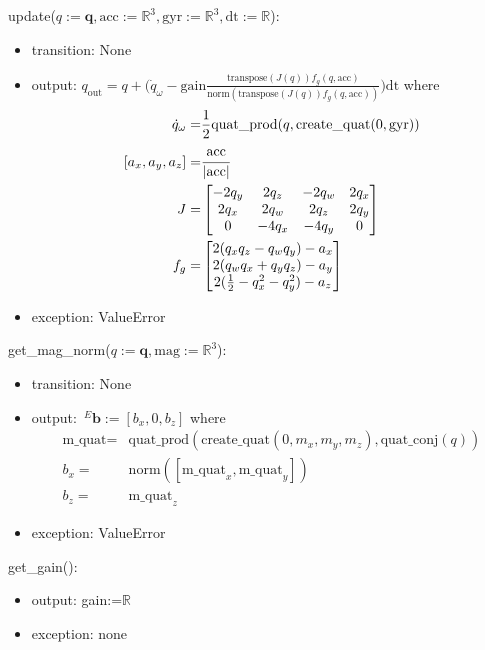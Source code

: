\documentclass[12pt, titlepage]{article}
\begin{document}
\noindent update($q:=\mathbf{q}, \text{acc}:=\mathbb{R}^3, \text{gyr}:=\mathbb{R}^3,
\text{dt}:=\mathbb{R}$):
\begin{itemize}
\item transition: None
\item output: $q_\text{out} = q + \Big( \dot{q}_{\omega} -
\text{gain}\frac{\text{transpose}(J(q))f_g( q, \text{acc})}{\text{norm}(\text{transpose}(J(q))f_g(
q, \text{acc}))}\Big) \text{dt}$ where
\begin{align*}
  \dot{q}_{\omega} =& \frac{1}{2} \text{quat\_prod}(q, \text{create\_quat}(0, \text{gyr})) \\
  [a_x, a_y, a_z] =& \cfrac{\text{acc}}{|\text{acc}|} \\
  J =& \begin{bmatrix}
    -2q_y & 2q_z & -2q_w & 2q_x \\
    2q_x & 2q_w & 2q_z & 2q_y \\
    0 & -4q_x & -4q_y & 0
    \end{bmatrix}\\
  f_{g} =& \begin{bmatrix}
    2(q_xq_z-q_wq_y)-a_x \\ 2(q_wq_x+q_yq_z)-a_y \\ 2(\frac{1}{2}-q_x^2-q_y^2)-a_z
  \end{bmatrix}
\end{align*}
\item exception: ValueError
\end{itemize}

\noindent get\_mag\_norm($q:=\mathbf{q}, \text{mag}:=\mathbb{R}^3$):
\begin{itemize}
\item transition: None
\item output: $\,^E\mathbf{b}:= [b_x, 0, b_z]$ where
\begin{align*}
  \text{m\_quat} =& \text{quat\_prod}(\text{create\_quat}(0, m_x, m_y, m_z), \text{quat\_conj}(q)) \\
  b_x =& \text{norm}([\text{m\_quat}_x, \text{m\_quat}_y]) \\
  b_z =& \text{m\_quat}_z
\end{align*}
\item exception: ValueError
\end{itemize}

\noindent get\_gain():
\begin{itemize}
\item output: gain:=$\mathbb{R}$
\item exception: none
\end{itemize}
\end{document}

